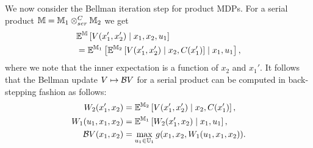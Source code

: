 \documentclass[conference]{IEEEtran}
\begin{document}
We now consider the Bellman iteration step for product MDPs. For a serial product $\mathbb{M} = \mathbb{M}_1 \otimes_{ser}^{C} \mathbb{M}_2$ we get
\begin{equation*}
\begin{aligned}
	&  \mathbb{E}^{\mathbb{M}}\left[ V(x_1', x_2') \mid x_1, x_2, u_1 \right] \\ 
	& = \mathbb{E}^{\mathbb{M}_1} \left[ \mathbb{E}^{\mathbb{M}_2} \left[ V(x_1', x_2') \mid x_2, C(x_1')  \right] \mid x_1, u_1   \right],
\end{aligned}
\end{equation*}
where we note that the inner expectation is a function of $x_2$ and $x_1'$.
It follows that the Bellman update $V \mapsto \mathcal{B} V$ for a serial product can be computed in back-stepping fashion as follows:
\begin{equation*}
\begin{aligned}
	W_2(x_1', x_2) & = \mathbb{E}^{\mathbb{M}_2} \left[ V(x_1', x_2') \mid x_2, C(x_1')  \right], \\
	W_1(u_1, x_1, x_2) & = \mathbb{E}^{\mathbb{M}_1} \left[ W_2(x_1', x_2) \mid x_1, u_1   \right], \\
	\mathcal{B} V(x_1, x_2) & = \max_{u_1 \in \mathbb{U}_1} g(x_1, x_2, W_1(u_1, x_1, x_2)).
\end{aligned}
\end{equation*}
\end{document}
